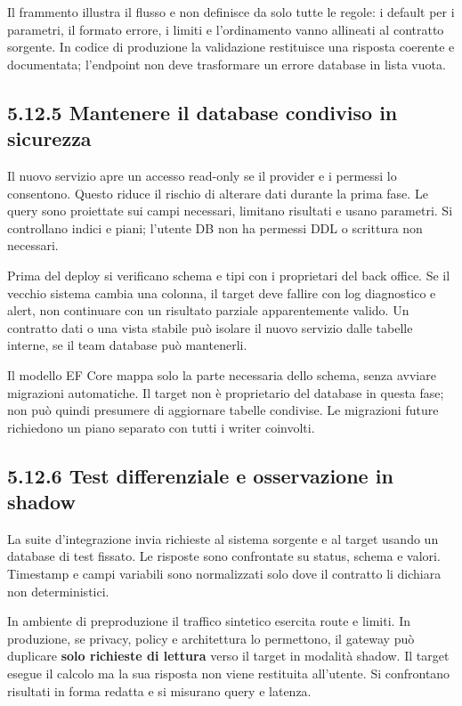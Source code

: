 \documentclass[
  italian,
  10pt,
]{book}
\begin{document}
Il frammento illustra il flusso e non definisce da solo tutte le regole:
i default per i parametri, il formato errore, i limiti e l'ordinamento
vanno allineati al contratto sorgente. In codice di produzione la
validazione restituisce una risposta coerente e documentata; l'endpoint
non deve trasformare un errore database in lista vuota.

\subsection{5.12.5 Mantenere il database condiviso in
sicurezza}\label{mantenere-il-database-condiviso-in-sicurezza}

Il nuovo servizio apre un accesso read-only se il provider e i permessi
lo consentono. Questo riduce il rischio di alterare dati durante la
prima fase. Le query sono proiettate sui campi necessari, limitano
risultati e usano parametri. Si controllano indici e piani; l'utente DB
non ha permessi DDL o scrittura non necessari.

Prima del deploy si verificano schema e tipi con i proprietari del back
office. Se il vecchio sistema cambia una colonna, il target deve fallire
con log diagnostico e alert, non continuare con un risultato parziale
apparentemente valido. Un contratto dati o una vista stabile può isolare
il nuovo servizio dalle tabelle interne, se il team database può
mantenerli.

Il modello EF Core mappa solo la parte necessaria dello schema, senza
avviare migrazioni automatiche. Il target non è proprietario del
database in questa fase; non può quindi presumere di aggiornare tabelle
condivise. Le migrazioni future richiedono un piano separato con tutti i
writer coinvolti.

\subsection{5.12.6 Test differenziale e osservazione in
shadow}\label{test-differenziale-e-osservazione-in-shadow}

La suite d'integrazione invia richieste al sistema sorgente e al target
usando un database di test fissato. Le risposte sono confrontate su
status, schema e valori. Timestamp e campi variabili sono normalizzati
solo dove il contratto li dichiara non deterministici.

In ambiente di preproduzione il traffico sintetico esercita route e
limiti. In produzione, se privacy, policy e architettura lo permettono,
il gateway può duplicare \textbf{solo richieste di lettura} verso il
target in modalità shadow. Il target esegue il calcolo ma la sua
risposta non viene restituita all'utente. Si confrontano risultati in
forma redatta e si misurano query e latenza.
\end{document}
